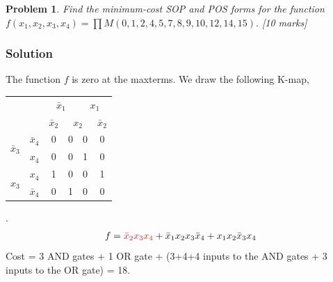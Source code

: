 \documentclass[twocolumn]{article}
\newtheorem{prob}{Problem}
\newcommand{\bx}{\bar{x}}
\newcommand{\cred}{\color{red}}
\begin{document}
\begin{prob}
Find the minimum-cost SOP and POS forms for the function $f(x_1 , x_2 , x_3,
x_4) = \prod M(0, 1, 2, 4, 5, 7, 8, 9, 10, 12, 14, 15).$ \cite[Prob
2.39]{brown2013fundamentals} [10 marks]
\end{prob}

\subsubsection*{Solution}

The function $f$ is zero at the maxterms. We draw the following K-map,
\\
\begin{tabular}{c|c|c|c|c|c}
  \toprule
  && \multicolumn{2}{c|}{$\bx_1$} & \multicolumn{2}{c}{$x_1$}
  \\
  && $\bx_2$ & \multicolumn{2}{c|}{$x_2$} & $\bx_2$
  \\ \midrule
  \multirow{2}{*}{$\bx_3$} & $\bx_4$
                                  & 0 & 0 & 0 & 0
  \\
  & $x_4$
                                  & 0 & 0 & 1 & 0
  \\
  \multirow{2}{*}{$x_3$}   &  $x_4$
                                  & \cred 1 & 0 & 0 & \cred 1
  \\
  & $\bx_4$
                                  & 0 & 1 & 0 & 0
  \\\bottomrule
\end{tabular}.
\\
\begin{align}
  f = {\cred \bx_2 x_3 x_4} + \bx_1 x_2  x_3 \bx_4 + x_1 x_2 \bx_3 x_4
\end{align}
Cost = 3 AND gates + 1 OR gate + (3+4+4 inputs to the AND gates + 3 inputs to the OR
gate) = 18.
\end{document}
